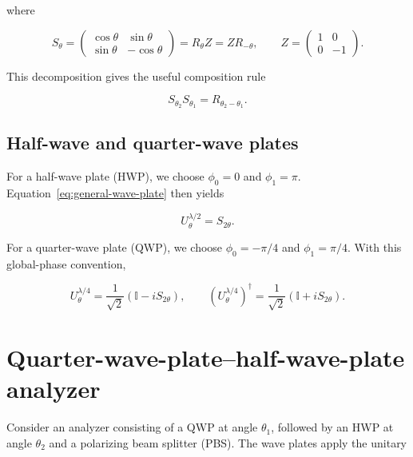 \documentclass[a4paper,10pt]{article}
\newcommand{\I}{\mathbb{I}}
\begin{document}
where

\begin{equation}
    S_\theta
    =
    \begin{pmatrix}
        \cos\theta & \sin\theta \\
        \sin\theta & -\cos\theta
    \end{pmatrix}
    =R_\theta Z
    =ZR_{-\theta},
    \qquad
    Z=
    \begin{pmatrix}
        1 & 0 \\
        0 & -1
    \end{pmatrix}.
    \label{eq:S-operator}
\end{equation}

This decomposition gives the useful composition rule

\begin{equation}
    S_{\theta_2}S_{\theta_1}=R_{\theta_2-\theta_1}.
    \label{eq:S-composition}
\end{equation}

\subsection{Half-wave and quarter-wave plates}

For a half-wave plate (HWP), we choose $\phi_0=0$ and $\phi_1=\pi$.
Equation~\eqref{eq:general-wave-plate} then yields

\begin{equation}
    U^{\lambda/2}_\theta=S_{2\theta}.
    \label{eq:hwp}
\end{equation}

For a quarter-wave plate (QWP), we choose $\phi_0=-\pi/4$ and
$\phi_1=\pi/4$. With this global-phase convention,

\begin{equation}
    U^{\lambda/4}_\theta
    =\frac{1}{\sqrt{2}}\left(\I-iS_{2\theta}\right),
    \qquad
    \left(U^{\lambda/4}_\theta\right)^\dagger
    =\frac{1}{\sqrt{2}}\left(\I+iS_{2\theta}\right).
    \label{eq:qwp}
\end{equation}

\section{Quarter-wave-plate--half-wave-plate analyzer}

Consider an analyzer consisting of a QWP at angle $\theta_1$, followed by an
HWP at angle $\theta_2$ and a polarizing beam splitter (PBS). The wave plates
apply the unitary
\end{document}

